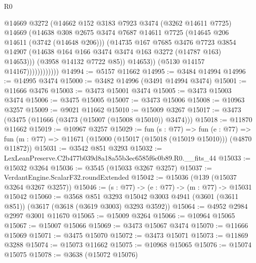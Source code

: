 \begin{lexlean}{R0}
\begin{coremodule}
                              @14669
                              @3272
                              (@14662
                                @152
                                @3183
                                @7923
                                @3474
                                (@3262 @14611 @7725)
                                @14669
                                (@14638
                                  @308
                                  @2675
                                  @3474
                                  @7687
                                  @14611
                                  @7725
                                  (@14645 @206 @14611 (@3742 (@14648 @206)))
                                  (@14735
                                    @167
                                    @7685
                                    @3476
                                    @7723
                                    @3854
                                    @14907
                                    (@14638 @164 @166 @3474 @3474 @163 @3272 (@14787 @163) @14653)))
                                (@3958 @14132 @7722 @85))
                              @14653))
                          (@5130 @14157 @14167))))))))))))
@14994 := @5157 @11662
@14995 := @3484 @14994
@14996 := @14995 @3474
@15000 := @3482 @14996 (@3491 @14994 @3474)
@15001 := @11666 @3476
@15003 := @3473 @15001 @3474
@15005 := @3473 @15003 @3474
@15006 := @3475 @15005
@15007 := @3473 @15006
@15008 := @10963 @3257
@15009 := @9021 @11662
@15010 := @15009 @3267
@15017 := @3473 (@3475 (@11666 (@3473 (@15007 (@15008 @15010)) @3474)))
@15018 := @11870 @11662
@15019 := @10967 @3257
@15029 := fun (s : @77) =>
  fun (e : @77) => fun (m : @77) => @11671 (@15000 (@15017 (@15018 (@15019 @15010))) (@4870 @11872))
@15031 := @3542 @851 @3293
@15032 := LexLeanPreserve.C2b477b039d8a18a55b3ec6585f6c0b89.R0.__fits_44
@15033 := @15032 @3264
@15036 := @3545 (@15033 @3267 @3257)
@15037 := VerdantEngine.ScalarF32.roundExtended
@15042 := @15036 (@139 (@15037 @3264 @3267 @3257))
@15046 := (s : @77) -> (e : @77) -> (m : @77) -> @15031 @15042
@15060 := @3568
    @851
    @3293
    @15042
    @3003
    @4941
    (@3601 (@3611 @851))
    (@3617 (@3618 (@3619 @3003) @3293 @3592))
@15064 := @4952 @2984 @2997 @3001 @11670
@15065 := @15009 @3264
@15066 := @10964 @15065
@15067 := @15007 @15066
@15069 := @3473 @15067 @3474
@15070 := @11666 @15069
@15071 := @3475 @15070
@15072 := @3473 @15071
@15073 := @11869 @3288
@15074 := @15073 @11662
@15075 := @10968 @15065
@15076 := @15074 @15075
@15078 := @3638 (@15072 @15076)

\end{coremodule}
\end{lexlean}
